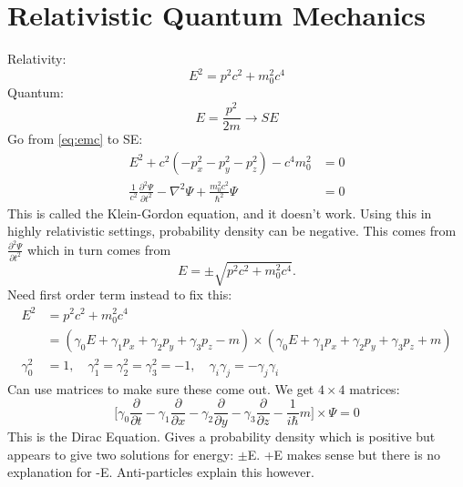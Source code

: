 \documentclass[a4paper, 11pt, normalem]{report}
\begin{document}
\section{Relativistic Quantum Mechanics}
Relativity:
\begin{equation}
    E^{2} = p^{2}c^{2} + m_{0}^{2}c^{4}
    \label{eq:emc}
\end{equation}
Quantum:
\begin{equation}
    E = \frac{p^{2}}{2m} \rightarrow SE
\end{equation}
Go from \eqref{eq:emc} to SE:
\begin{align}
    E^{2} + c^{2}(-p_{x}^{2} - p_{y}^{2} - p_{z}^{2}) - c^{4}m_{0}^{2} &= 0 \\
    \frac{1}{c^{2}}\frac{\partial^{2}\Psi}{\partial t^{2}} - \nabla^{2}\Psi + \frac{m_{0}^{2}c^{2}}{\hbar^{2}}\Psi &= 0
\end{align}
This is called the Klein-Gordon equation, and it doesn't work.
Using this in highly relativistic settings, probability density can be negative.
This comes from $\frac{\partial^{2}\Psi}{\partial t^{2}}$ which in turn comes from
\begin{equation}
    E = \pm\sqrt{p^{2}c^{2} + m_{0}^{2}c^{4}}.
\end{equation}
Need first order term instead to fix this:
\begin{align}
    E^{2} &= p^{2}c^{2} + m_{0}^{2}c^{4} \\
          &= (\gamma_{0}E + \gamma_{1}p_{x} + \gamma_{2}p_{y} + \gamma_{3}p_{z} - m) \times (\gamma_{0}E + \gamma_{1}p_{x} + \gamma_{2}p_{y} + \gamma_{3}p_{z} + m) \\
    \gamma_{0}^{2} &= 1,\quad \gamma_{1}^{2} = \gamma_{2}^{2} = \gamma_{3}^{2} = -1,\quad \gamma_{i}\gamma_{j} = -\gamma_{j}\gamma_{i}
\end{align}
Can use matrices to make sure these come out.
We get $4 \times 4$ matrices:
\begin{equation}
    \Bigg[\gamma_{0}\frac{\partial}{\partial t} - \gamma_{1}\frac{\partial}{\partial x} - \gamma_{2}\frac{\partial}{\partial y} - \gamma_{3}\frac{\partial}{\partial z} - \frac{1}{i\hbar}m\Bigg]\times\Psi = 0
\end{equation}
This is the Dirac Equation.
Gives a probability density which is positive but appears to give two solutions for energy: $\pm$E.
+E makes sense but there is no explanation for -E.
Anti-particles explain this however.
\end{document}
